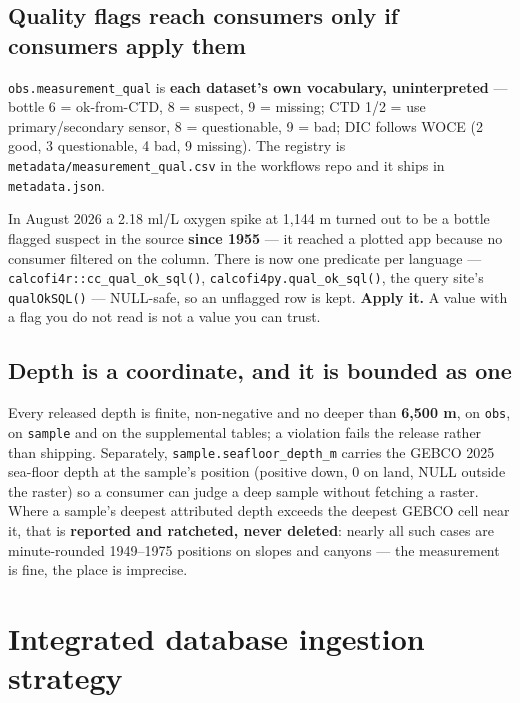\documentclass[
  letterpaper,
  DIV=11,
  numbers=noendperiod]{scrreprt}
\begin{document}
\subsection{Quality flags reach consumers only if consumers apply
them}\label{quality-flags-reach-consumers-only-if-consumers-apply-them}

\texttt{obs.measurement\_qual} is \textbf{each dataset's own vocabulary,
uninterpreted} --- bottle 6 = ok-from-CTD, 8 = suspect, 9 = missing; CTD
1/2 = use primary/secondary sensor, 8 = questionable, 9 = bad; DIC
follows WOCE (2 good, 3 questionable, 4 bad, 9 missing). The registry is
\texttt{metadata/measurement\_qual.csv} in the workflows repo and it
ships in \texttt{metadata.json}.

In August 2026 a 2.18 ml/L oxygen spike at 1,144 m turned out to be a
bottle flagged suspect in the source \textbf{since 1955} --- it reached
a plotted app because no consumer filtered on the column. There is now
one predicate per language --- \texttt{calcofi4r::cc\_qual\_ok\_sql()},
\texttt{calcofi4py.qual\_ok\_sql()}, the query site's
\texttt{qualOkSQL()} --- NULL-safe, so an unflagged row is kept.
\textbf{Apply it.} A value with a flag you do not read is not a value
you can trust.

\subsection{Depth is a coordinate, and it is bounded as
one}\label{depth-is-a-coordinate-and-it-is-bounded-as-one}

Every released depth is finite, non-negative and no deeper than
\textbf{6,500 m}, on \texttt{obs}, on \texttt{sample} and on the
supplemental tables; a violation fails the release rather than shipping.
Separately, \texttt{sample.seafloor\_depth\_m} carries the GEBCO 2025
sea-floor depth at the sample's position (positive down, 0 on land, NULL
outside the raster) so a consumer can judge a deep sample without
fetching a raster. Where a sample's deepest attributed depth exceeds the
deepest GEBCO cell near it, that is \textbf{reported and ratcheted,
never deleted}: nearly all such cases are minute-rounded 1949--1975
positions on slopes and canyons --- the measurement is fine, the place
is imprecise.

\section{Integrated database ingestion
strategy}\label{integrated-database-ingestion-strategy}
\end{document}
